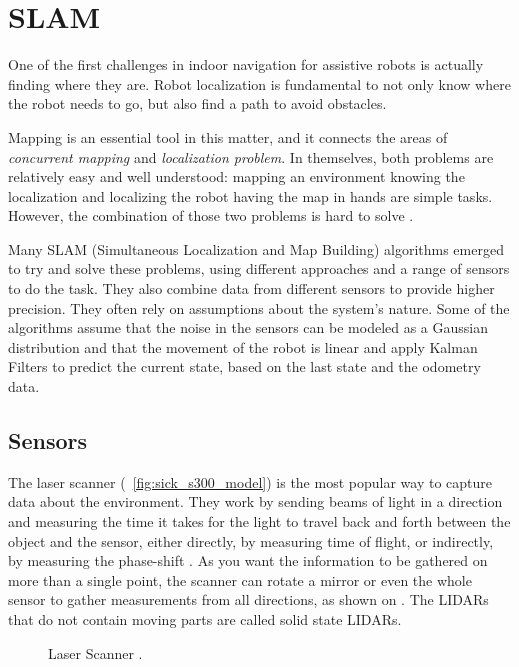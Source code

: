 \chapter{SLAM}\label{chp:slam_mapping}

One of the first challenges in indoor navigation for assistive robots is actually finding where they are. Robot localization is fundamental to not only know where the robot needs to go, but also find a path to avoid obstacles.

Mapping is an essential tool in this matter, and it connects the areas of \textit{concurrent mapping} and \textit{localization problem}. In themselves, both problems are relatively easy and well understood: mapping an environment knowing the localization and localizing the robot having the map in hands are simple tasks. However, the combination of those two problems is hard to solve \cite{thrun2000real}.

Many SLAM (Simultaneous Localization and
Map Building) algorithms emerged to try and solve these problems, using different approaches and a range of sensors to do the task. They also combine data from different sensors to provide higher precision. They often rely on assumptions about the system's nature. Some of the algorithms assume that the noise in the sensors can be modeled as a Gaussian distribution and that the movement of the robot is linear and apply Kalman Filters to predict the current state, based on the last state and the odometry data.

\section{Sensors}

The laser scanner (\figurename~\ref{fig:sick_s300_model}) is the most popular way to capture data about the environment. They work by sending beams of light in a direction and measuring the time it takes for the light to travel back and forth between the object and the sensor, either directly, by measuring time of flight, or indirectly, by measuring the phase-shift \cite{amann2001laser}. As you want the information to be gathered on more than a single point, the scanner can rotate a mirror or even the whole sensor to gather measurements from all directions, as shown on . The LIDARs that do not contain moving parts are called solid state LIDARs.

\begin{figure}
     \centering
     \caption[Laser Scanner.]{Laser Scanner \cite{sicks300}.}
     \label{fig:sick_s300}
\end{figure}

